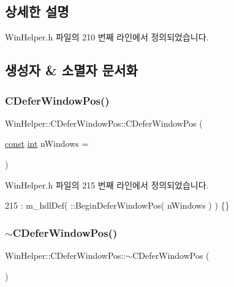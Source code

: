 \subsection{상세한 설명}


Win\+Helper.\+h 파일의 210 번째 라인에서 정의되었습니다.



\subsection{생성자 \& 소멸자 문서화}
\mbox{\label{class_win_helper_1_1_c_defer_window_pos_ac98b161abd5044c2a2e1e8b8efa0744f}} 
\subsubsection{\texorpdfstring{C\+Defer\+Window\+Pos()}{CDeferWindowPos()}}
{\footnotesize\ttfamily Win\+Helper\+::\+C\+Defer\+Window\+Pos\+::\+C\+Defer\+Window\+Pos (\begin{DoxyParamCaption}\item[{\mbox{\hyperlink{getopt1_8c_a2c212835823e3c54a8ab6d95c652660e}{const}} \mbox{\hyperlink{_util_8cpp_a0ef32aa8672df19503a49fab2d0c8071}{int}}}]{n\+Windows = {} }\end{DoxyParamCaption})\hspace{0.3cm}{\ttfamily [inline]}}



Win\+Helper.\+h 파일의 215 번째 라인에서 정의되었습니다.


\begin{DoxyCode}
215 : m\_hdlDef( ::BeginDeferWindowPos( nWindows ) ) \{\}
\end{DoxyCode}
\mbox{\label{class_win_helper_1_1_c_defer_window_pos_a00fc71f25d7b35c3126950290fa205fe}} 
\subsubsection{\texorpdfstring{$\sim$\+C\+Defer\+Window\+Pos()}{~CDeferWindowPos()}}
{\footnotesize\ttfamily Win\+Helper\+::\+C\+Defer\+Window\+Pos\+::$\sim$\+C\+Defer\+Window\+Pos (\begin{DoxyParamCaption}{ }\end{DoxyParamCaption})\hspace{0.3cm}{\ttfamily [inline]}}



